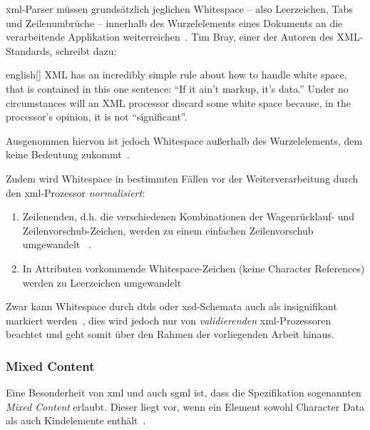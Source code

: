 \acrshort{xml}-Parser müssen grundsätzlich jeglichen Whitespace -- also Leerzeichen, Tabs und Zeilenumbrüche --  innerhalb des Wurzelelements eines Dokuments an die verarbeitende Applikation weiterreichen~\cite[Abschn.~2.10]{xml}. Tim Bray, einer der Autoren des XML-Standards, schreibt dazu:

\begin{foreigndisplayquote}{english}[{\cite[Abschn.~2.1 T-2]{bray1998axml}}]
    XML has an incredibly simple rule about how to handle white space, that is contained in this one sentence: \enquote{If it ain't markup, it's data.} Under no circumstances will an XML processor discard some white space because, in the processor's opinion, it is not \enquote{significant}.
\end{foreigndisplayquote}

Ausgenommen hiervon ist jedoch Whitespace außerhalb des Wurzelelements, dem keine Bedeutung zukommt~\cite[Abschn.~2.1]{c14n}.

\begin{samepage}
    Zudem wird Whitespace in bestimmten Fällen vor der Weiterverarbeitung durch den \acrshort{xml}-Prozessor \emph{normalisiert}:
    \begin{enumerate}
        \item{} Zeilenenden, d.h. die verschiedenen Kombinationen der Wagenrücklauf- und \linebreak{}Zeilenvorschub-Zeichen, werden zu einem einfachen Zeilenvorschub umgewandelt ~\cite[Abschn..~2.11]{xml}.
        \item{} In Attributen vorkommende Whitespace-Zeichen (keine Character References) werden zu Leerzeichen umgewandelt~\cite[Abschn.~3.3.3]{xml}
    \end{enumerate}
\end{samepage}

Zwar kann Whitespace durch \glspl{dtd} oder \acrshort{xsd}-Schemata auch als insignifikant markiert werden~\cite{page2005whitespace}, dies wird jedoch nur von \emph{validierenden} \acrshort{xml}-Prozessoren beachtet und geht somit über den Rahmen der vorliegenden Arbeit hinaus.

\subsubsection{Mixed Content}
\label{sec:mixedcontent}

Eine Besonderheit von \acrshort{xml} und auch \acrshort{sgml} ist, dass die Spezifikation sogenannten \emph{Mixed Content} erlaubt. Dieser liegt vor, wenn ein Element sowohl Character Data als auch Kindelemente enthält~\cite[Abschn.~3.2.2]{xml}.

